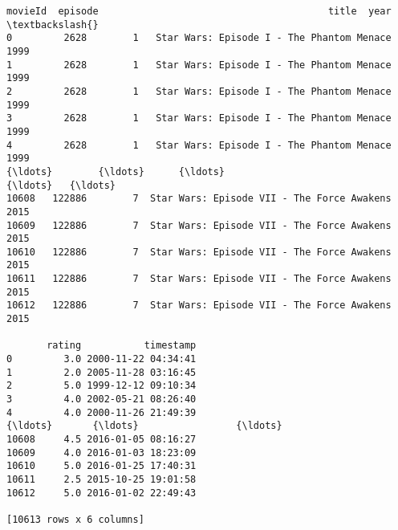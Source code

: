 \documentclass[11pt]{article}
\makeatletter
\newcommand{\boxspacing}{\kern\kvtcb@left@rule\kern\kvtcb@boxsep}
\newcommand{\prompt}[4]{
        {\ttfamily\llap{{\color{#2}[#3]:\hspace{3pt}#4}}\vspace{-\baselineskip}}
    }
\makeatother
\begin{document}
            \begin{tcolorbox}[breakable, size=fbox, boxrule=.5pt, pad at break*=1mm, opacityfill=0]
\prompt{Out}{outcolor}{56}{\boxspacing}
\begin{Verbatim}[commandchars=\\\{\}]
       movieId  episode                                        title  year  \textbackslash{}
0         2628        1   Star Wars: Episode I - The Phantom Menace   1999
1         2628        1   Star Wars: Episode I - The Phantom Menace   1999
2         2628        1   Star Wars: Episode I - The Phantom Menace   1999
3         2628        1   Star Wars: Episode I - The Phantom Menace   1999
4         2628        1   Star Wars: Episode I - The Phantom Menace   1999
{\ldots}        {\ldots}      {\ldots}                                          {\ldots}   {\ldots}
10608   122886        7  Star Wars: Episode VII - The Force Awakens   2015
10609   122886        7  Star Wars: Episode VII - The Force Awakens   2015
10610   122886        7  Star Wars: Episode VII - The Force Awakens   2015
10611   122886        7  Star Wars: Episode VII - The Force Awakens   2015
10612   122886        7  Star Wars: Episode VII - The Force Awakens   2015

       rating           timestamp
0         3.0 2000-11-22 04:34:41
1         2.0 2005-11-28 03:16:45
2         5.0 1999-12-12 09:10:34
3         4.0 2002-05-21 08:26:40
4         4.0 2000-11-26 21:49:39
{\ldots}       {\ldots}                 {\ldots}
10608     4.5 2016-01-05 08:16:27
10609     4.0 2016-01-03 18:23:09
10610     5.0 2016-01-25 17:40:31
10611     2.5 2015-10-25 19:01:58
10612     5.0 2016-01-02 22:49:43

[10613 rows x 6 columns]
\end{Verbatim}
\end{tcolorbox}
        
\end{document}
